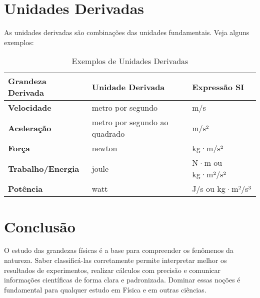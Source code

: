 \documentclass[portuguese,11pt,a4paper,oneside,onecolumn,notitlepage]{article}
\begin{document}
	\section{Unidades Derivadas}
	As unidades derivadas são combinações das unidades fundamentais. Veja alguns exemplos:
	
	\begin{table}[H]
		\centering
		\begin{tabular}{>{\bfseries}l l l}
			\toprule
			Grandeza Derivada & Unidade Derivada & Expressão SI \\
			\midrule
			Velocidade         & metro por segundo    & m/s \\
			Aceleração         & metro por segundo ao quadrado & m/s² \\
			Força              & newton                & kg·m/s² \\
			Trabalho/Energia   & joule                 & N·m ou kg·m²/s² \\
			Potência           & watt                  & J/s ou kg·m²/s³ \\
			\bottomrule
		\end{tabular}
		\caption{Exemplos de Unidades Derivadas}
	\end{table}
	
	\section{Conclusão}
	O estudo das grandezas físicas é a base para compreender os fenômenos da natureza. Saber classificá-las corretamente permite interpretar melhor os resultados de experimentos, realizar cálculos com precisão e comunicar informações científicas de forma clara e padronizada. Dominar essas noções é fundamental para qualquer estudo em Física e em outras ciências.
	
\end{document}
